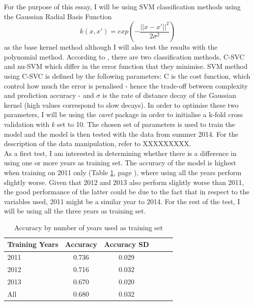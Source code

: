 \documentclass [a4paper,12 pt]{article}
\begin{document}
  For the purpose of this essay, I will be using SVM classification methods using the Gaussian Radial Basis Function $$k(x, x\prime) = exp(-\frac{||x-x\prime||^2}{2\sigma^2})$$ as the base kernel method although I will also test the results with the polynomial method. According to \cite{svmStatSoft}, there are two classification methods, C-SVC and nu-SVM which differ in the error function that they minimise. SVM method using C-SVC is defined by the following parameters: C is the cost function, which control how much the error is penalised - hence the trade-off between complexity and prediction accuracy - and $\sigma$ is the rate of distance decay of the Gaussian kernel (high values correspond to slow decays). In order to optimise these two parameters, I will be using the \emph{caret} package in order to initialise a k-fold cross validation with \emph{k} set to 10.  The chosen set of parameters is used to train the model and the model is then tested with the data from summer 2014. For the description of the data manipulation, refer to XXXXXXXXX. \\ 
As a first test, I am interested in determining whether there is a difference in using one or more years as training set.  The accuracy of the model is highest when training on 2011 only (Table \ref{table:TAByears}, page \pageref{table:TAByears}), where using all the years perform slightly worse. Given that 2012 and 2013 also perform slightly worse than 2011, the good performance of the latter could be due to the fact that in respect to the variables used, 2011 might be a similar year to 2014. For the rest of the test, I will be using all the three years as training set.\\

\begin{table}
\begin{center}
\begin{tabular}{l*{4}{c}r}
Training Years & Accuracy & Accuracy SD \\
\hline
2011 & 0.736 & 0.029  \\
2012 & 0.716 & 0.032  \\
2013 & 0.670 & 0.020  \\
All  & 0.680 & 0.032  \\
\end{tabular}\\
\caption{Accuracy by number of years used as training set}\label{table:TAByears}
\end{center}
\end{table}
\end{document}
